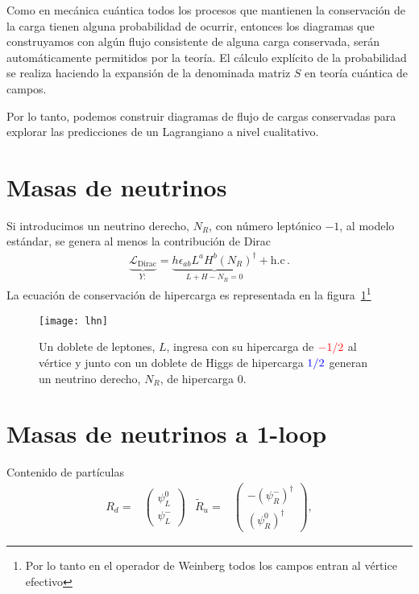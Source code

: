 Como en mecánica cuántica todos los procesos que mantienen la conservación de la carga tienen alguna probabilidad de ocurrir, entonces los diagramas que construyamos con algún flujo consistente de alguna carga conservada, serán automáticamente permitidos por la teoría. El cálculo explícito de la probabilidad se realiza haciendo la expansión de la denominada matriz $S$ en teoría cuántica de campos.

Por lo tanto, podemos construir diagramas de flujo de cargas conservadas para explorar las predicciones de un Lagrangiano  a nivel cualitativo. 

\section{Masas de neutrinos}
Si introducimos un neutrino derecho, $N_R$, con número leptónico $-1$,  al  modelo estándar, se genera al menos la contribución de Dirac
\begin{align}
  \underbrace{\mathcal{L}_{\text{Dirac}}}_{\displaystyle Y:}=
  \underbrace{h  \epsilon_{ab} L^{a} H^{b} \left( N_R \right)^{\dagger}}_{\displaystyle L+H -N_R=0 } +\text{h.c}\,. 
\end{align}
La ecuación de conservación de hipercarga es representada en la figura~\ref{fig:lhn}\footnote{Por lo tanto en el operador de Weinberg todos los campos entran al vértice efectivo}

\begin{figure}
  \centering
  \texttt{[image: lhn]}
  \caption{Un doblete de leptones, $L$, ingresa con su hipercarga de $\color{red}-1/2$ al vértice  y junto con un doblete de Higgs de hipercarga $\color{blue}1/2$ generan un  neutrino derecho, $N_R$, de hipercarga $0$. }
  \label{fig:lhn}
\end{figure}



\section{Masas de neutrinos a 1-loop}
Contenido de partículas
  \begin{align*}
  R_{d}=&
  \begin{pmatrix}
    \psi_{L}^{0}\\
    \psi_{L}^{-}
  \end{pmatrix}
&  
\widetilde{R}_{u}=&
  \begin{pmatrix}
   - \left( \psi_{R}^{-} \right)^{\dagger}\\
     \left(\psi_{R}^{0}\right)^{\dagger}
  \end{pmatrix},
\end{align*}



